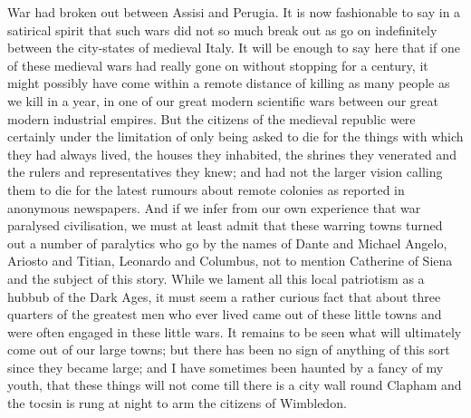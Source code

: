 \documentclass{book}
\begin{document}
War had broken out between Assisi and Perugia. It is now fashionable to say in a satirical spirit that such wars did not so much break out as go on indefinitely between the city-states of medieval Italy. It will be enough to say here that if one of these medieval wars had really gone on without stopping for a century, it might possibly have come within a remote distance of killing as many people as we kill in a year, in one of our great modern scientific wars between our great modern industrial empires. But the citizens of the medieval republic were certainly under the limitation of only being asked to die for the things with which they had always lived, the houses they inhabited, the shrines they venerated and the rulers and representatives they knew; and had not the larger vision calling them to die for the latest rumours about remote colonies as reported in anonymous newspapers. And if we infer from our own experience that war paralysed civilisation, we must at least admit that these warring towns turned out a number of paralytics who go by the names of Dante and Michael Angelo, Ariosto and Titian, Leonardo and Columbus, not to mention Catherine of Siena and the subject of this story. While we lament all this local patriotism as a hubbub of the Dark Ages, it must seem a rather curious fact that about three quarters of the greatest men who ever lived came out of these little towns and were often engaged in these little wars. It remains to be seen what will ultimately come out of our large towns; but there has been no sign of anything of this sort since they became large; and I have sometimes been haunted by a fancy of my youth, that these things will not come till there is a city wall round Clapham and the tocsin is rung at night to arm the citizens of Wimbledon.
\end{document}
